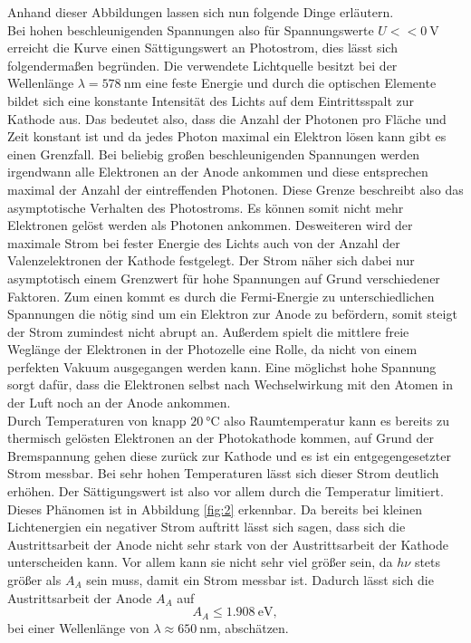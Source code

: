 Anhand dieser Abbildungen lassen sich nun folgende Dinge erläutern. 
\\
Bei hohen beschleunigenden Spannungen also für Spannungswerte $U << \SI{0}{\volt}$ erreicht die Kurve einen Sättigungswert an Photostrom, dies lässt sich folgendermaßen begründen. 
Die verwendete Lichtquelle besitzt bei der Wellenlänge $\lambda = \SI{578}{\nano\meter}$ eine feste Energie und durch die optischen Elemente bildet sich eine konstante Intensität des Lichts auf dem Eintrittsspalt zur Kathode aus. Das bedeutet also,
dass die Anzahl der Photonen pro Fläche und Zeit konstant ist und da jedes Photon maximal ein Elektron lösen kann gibt es einen Grenzfall. Bei beliebig großen beschleunigenden Spannungen werden irgendwann alle Elektronen an der Anode ankommen und diese entsprechen maximal der Anzahl der eintreffenden Photonen. Diese Grenze beschreibt
also das asymptotische Verhalten des Photostroms. Es können somit nicht mehr Elektronen gelöst werden als Photonen ankommen. Desweiteren wird der maximale Strom bei fester Energie des Lichts auch von der Anzahl der Valenzelektronen der Kathode festgelegt.
Der Strom näher sich dabei nur asymptotisch einem Grenzwert für hohe Spannungen auf Grund verschiedener Faktoren. Zum einen kommt es durch die Fermi-Energie zu unterschiedlichen Spannungen die nötig sind um ein Elektron zur Anode zu befördern, somit steigt der Strom zumindest nicht abrupt an. Außerdem spielt die mittlere freie
Weglänge der Elektronen in der Photozelle eine Rolle, da nicht von einem perfekten Vakuum ausgegangen werden kann. Eine möglichst hohe Spannung sorgt dafür, dass die Elektronen selbst nach Wechselwirkung mit den Atomen in der Luft noch an der Anode ankommen.
\\
Durch Temperaturen von knapp $\SI{20}{\celsius}$ also Raumtemperatur kann es bereits zu thermisch gelösten Elektronen an der Photokathode kommen, auf Grund der Bremspannung gehen diese zurück zur Kathode und es ist ein entgegengesetzter Strom messbar. Bei sehr hohen Temperaturen lässt sich
dieser Strom deutlich erhöhen. Der Sättigungswert ist also vor allem durch die Temperatur limitiert. Dieses Phänomen ist in Abbildung \ref{fig:2} erkennbar. Da bereits bei kleinen Lichtenergien ein negativer Strom auftritt lässt sich sagen, dass sich die Austrittsarbeit der Anode nicht sehr stark von der Austrittsarbeit der Kathode unterscheiden kann.
Vor allem kann sie nicht sehr viel größer sein, da $h\nu$ stets größer als $A_A$ sein muss, damit ein Strom messbar ist. Dadurch lässt sich die Austrittsarbeit der Anode $A_A$ auf 
\begin{equation}
A_A \leq \SI{1.908}{\electronvolt},
\end{equation}
bei einer Wellenlänge von $\lambda \approx \SI{650}{\nano\meter}$, abschätzen.